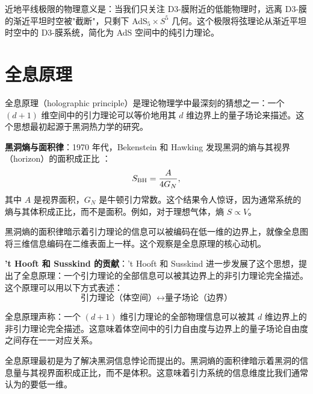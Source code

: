 \begin{remark}[近地平线极限的物理意义]
近地平线极限的物理意义是：当我们只关注 D3-膜附近的低能物理时，远离 D3-膜的渐近平坦时空被"截断"，只剩下 AdS$_5 \times S^5$ 几何。这个极限将弦理论从渐近平坦时空中的 D3-膜系统，简化为 AdS 空间中的纯引力理论。
\end{remark}

\section{全息原理}

全息原理（holographic principle）是理论物理学中最深刻的猜想之一：一个 $(d+1)$ 维空间中的引力理论可以等价地用其 $d$ 维边界上的量子场论来描述。这个思想最初起源于黑洞热力学的研究。

\textbf{黑洞熵与面积律}：1970 年代，Bekenstein 和 Hawking 发现黑洞的熵与其视界（horizon）的面积成正比 \cite{Bekenstein1973, Hawking1975}：
\begin{equation}
    S_{\rm BH} = \frac{A}{4G_N},
\end{equation}
其中 $A$ 是视界面积，$G_N$ 是牛顿引力常数。这个结果令人惊讶，因为通常系统的熵与其体积成正比，而不是面积。例如，对于理想气体，熵 $S \propto V$。

\begin{remark}[黑洞熵面积律的深刻含义]
黑洞熵的面积律暗示着引力理论的信息可以被编码在低一维的边界上，就像全息图将三维信息编码在二维表面上一样。这个观察是全息原理的核心动机。
\end{remark}

\textbf{'t Hooft 和 Susskind 的贡献}：'t Hooft 和 Susskind 进一步发展了这个思想，提出了全息原理：一个引力理论的全部信息可以被其边界上的非引力理论完全描述。这个原理可以用以下方式表述：
\begin{equation}
    \text{引力理论（体空间）} \longleftrightarrow \text{量子场论（边界）}
\end{equation}

\begin{definition}[全息原理]
全息原理声称：一个 $(d+1)$ 维引力理论的全部物理信息可以被其 $d$ 维边界上的非引力理论完全描述。这意味着体空间中的引力自由度与边界上的量子场论自由度之间存在一一对应关系。
\end{definition}

\begin{note}[全息原理与信息悖论]
全息原理最初是为了解决黑洞信息悖论而提出的。黑洞熵的面积律暗示着黑洞的信息量与其视界面积成正比，而不是体积。这意味着引力系统的信息维度比我们通常认为的要低一维。
\end{note}


